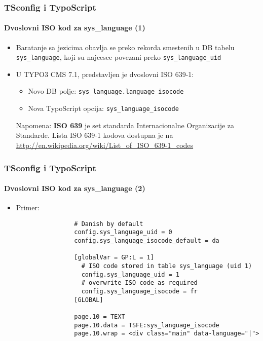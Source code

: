 \begin{frame}[fragile]
	\frametitle{TSconfig i TypoScript}
	\framesubtitle{Dvoslovni ISO kod za sys\_language (1)}

	\begin{itemize}
		\item Baratanje sa jezicima obavlja se preko rekorda smestenih u DB tabelu
			\texttt{sys\_language}, koji su najcesce povezani preko \texttt{sys\_language\_uid}
		\item U TYPO3 CMS 7.1, predstavljen je dvoslovni ISO 639-1:

			\begin{itemize}
				\item Novo DB polje: \texttt{sys\_language.language\_isocode}
				\item Nova TypoScript opcija: \texttt{sys\_language\_isocode}
			\end{itemize}


		\vspace{1cm}

		\small
			Napomena: \textbf{ISO 639} je set standarda Internacionalne Organizacije za Standarde.
			Lista ISO 639-1 kodova dostupna je na\newline
			\url{http://en.wikipedia.org/wiki/List_of_ISO_639-1_codes}
		\normalsize

	\end{itemize}

\end{frame}


\begin{frame}[fragile]
	\frametitle{TSconfig i TypoScript}
	\framesubtitle{Dvoslovni ISO kod za sys\_language (2)}

	\begin{itemize}
		\item Primer:

			\begin{lstlisting}
				# Danish by default
				config.sys_language_uid = 0
				config.sys_language_isocode_default = da

				[globalVar = GP:L = 1]
				  # ISO code stored in table sys_language (uid 1)
				  config.sys_language_uid = 1
				  # overwrite ISO code as required
				  config.sys_language_isocode = fr
				[GLOBAL]

				page.10 = TEXT
				page.10.data = TSFE:sys_language_isocode
				page.10.wrap = <div class="main" data-language="|">
			\end{lstlisting}

	\end{itemize}

\end{frame}

